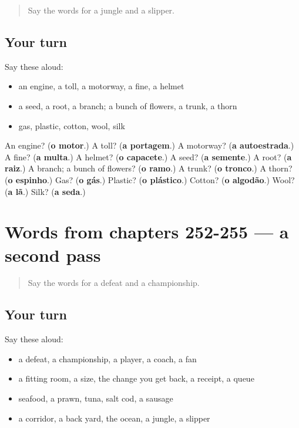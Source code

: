 \begin{quote}
Say the words for a jungle and a slipper.
\end{quote}

\subsection*{Your turn}
Say these aloud:

\begin{itemize}
\raggedright
  \item an engine, a toll, a motorway, a fine, a helmet
  \item a seed, a root, a branch; a bunch of flowers, a trunk, a thorn
  \item gas, plastic, cotton, wool, silk
\end{itemize}

\begin{tcolorbox}[breakable,colback=teal!4,colframe=teal!35!black,title={Before you move on}]
An engine? (\textbf{o motor}.) A toll? (\textbf{a portagem}.) A motorway? (\textbf{a autoestrada}.) A fine? (\textbf{a multa}.) A helmet? (\textbf{o capacete}.) A seed? (\textbf{a semente}.) A root? (\textbf{a raiz}.) A branch; a bunch of flowers? (\textbf{o ramo}.) A trunk? (\textbf{o tronco}.) A thorn? (\textbf{o espinho}.) Gas? (\textbf{o gás}.) Plastic? (\textbf{o plástico}.) Cotton? (\textbf{o algodão}.) Wool? (\textbf{a lã}.) Silk? (\textbf{a seda}.)
\end{tcolorbox}
\section[(dialogue)]{Words from chapters 252-255 — a second pass}

\label{lesson:PT-R255-second-pass-words-from-chapters-252-255}



\begin{quote}
Say the words for a defeat and a championship.
\end{quote}

\subsection*{Your turn}
Say these aloud:

\begin{itemize}
\raggedright
  \item a defeat, a championship, a player, a coach, a fan
  \item a fitting room, a size, the change you get back, a receipt, a queue
  \item seafood, a prawn, tuna, salt cod, a sausage
  \item a corridor, a back yard, the ocean, a jungle, a slipper
\end{itemize}

